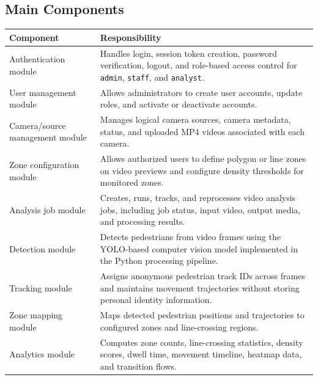 \documentclass[12pt,a4paper]{report}
\begin{document}
\subsection{Main Components}

\begin{longtable}{|p{4cm}|p{10cm}|}
\hline
\rowcolor{HeaderBlue}
\textbf{Component} & \textbf{Responsibility} \\
\hline

Authentication module & Handles login, session token creation, password verification, logout, and role-based access control for \texttt{admin}, \texttt{staff}, and \texttt{analyst}. \\
\hline

User management module & Allows administrators to create user accounts, update roles, and activate or deactivate accounts. \\
\hline

Camera/source management module & Manages logical camera sources, camera metadata, status, and uploaded MP4 videos associated with each camera. \\
\hline

Zone configuration module & Allows authorized users to define polygon or line zones on video previews and configure density thresholds for monitored zones. \\
\hline

Analysis job module & Creates, runs, tracks, and reprocesses video analysis jobs, including job status, input video, output media, and processing results. \\
\hline

Detection module & Detects pedestrians from video frames using the YOLO-based computer vision model implemented in the Python processing pipeline. \\
\hline

Tracking module & Assigns anonymous pedestrian track IDs across frames and maintains movement trajectories without storing personal identity information. \\
\hline

Zone mapping module & Maps detected pedestrian positions and trajectories to configured zones and line-crossing regions. \\
\hline

Analytics module & Computes zone counts, line-crossing statistics, density scores, dwell time, movement timeline, heatmap data, and transition flows. \\
\hline


\end{longtable}
\end{document}
